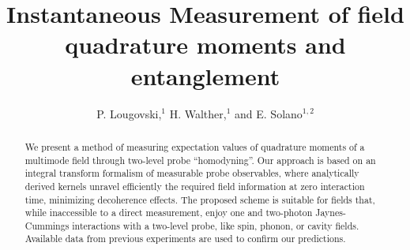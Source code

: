 \documentclass[pra,aps,twocolumn,showpacs]{revtex4}
\begin{document}
\sloppy

\title{Instantaneous Measurement of field quadrature moments and entanglement}

\author{P. Lougovski,$^1$ H. Walther,$^1$ and E. Solano$^{1,2}$}


\address{$^1$Max-Planck-Institut f{\"u}r Quantenoptik,
Hans-Kopfermann-Strasse 1, D-85748 Garching, Germany\\
$^2$Secci\'{o}n F\'{\i}sica, Departamento de Ciencias, Pontificia
Universidad Cat\'{o}lica del Per\'{u}, Apartado 1761, Lima, Peru }


\begin{abstract}
We present a method of measuring expectation values of quadrature
moments of a multimode field through two-level probe
``homodyning''. Our approach is based on an integral transform
formalism of measurable probe observables, where analytically
derived kernels unravel efficiently the required field information
at zero interaction time, minimizing decoherence effects. The
proposed scheme is suitable for fields that, while inaccessible to
a direct measurement, enjoy one and two-photon Jaynes-Cummings
interactions with a two-level probe, like spin, phonon, or cavity
fields. Available data from previous experiments are used to
confirm our predictions.
\end{abstract}


\maketitle
\end{document}
